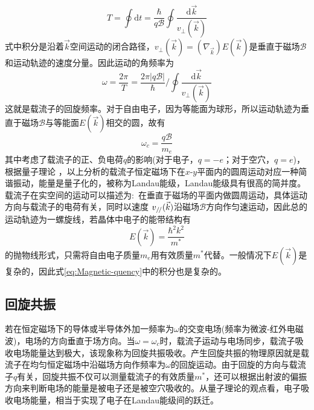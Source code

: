 \begin{equation}
	T=\oint\mathrm{d}t=\dfrac{\hbar}{q\mathscr{B}}\oint\dfrac{\mathrm{d}\vec k}{v_{\perp}(\vec k)}
	\label{eq:Magnet-Time}
\end{equation}
式中积分是沿着$\vec k$空间运动的闭合路径，$v_{\perp}(\vec k)=(\nabla_{\vec k})E(\vec k)$是垂直于磁场$\mathscr{B}$和运动轨迹的速度分量。因此运动的角频率为
\begin{equation}
	\omega=\dfrac{2\pi}{T}=\dfrac{2\pi|q\mathscr{B}|}{\hbar}/\oint\dfrac{\mathrm{d}\vec k}{v_{\perp}(\vec k)}
	\label{eq:Magnetic-quency}
\end{equation}
这就是载流子的回旋频率。对于自由电子，因为等能面为球形，所以运动轨迹为垂直于磁场$\mathscr{B}$与等能面$E(\vec k)$相交的圆，故有
\begin{equation}
	\omega_c=\dfrac{q\mathscr{B}}{m_e}
	\label{eq:Magnetic-circle-quency}
\end{equation}
其中考虑了载流子的正、负电荷$q$的影响(对于电子，$q=-e$；对于空穴，$q=e$)，根据量子理论%
，以上分析的载流子恒定磁场下在$x$-$y$平面内的圆周运动对应一种简谐振动，能量是量子化的，被称为Landau能级，Landau能级具有很高的简并度。载流子在实空间的运动可以描述为:~在垂直于磁场的平面内做圆周运动，具体运动方向与载流子的电荷有关，同时以速度%
$v_{\mathrel{/\mskip-2.5mu/}}(\vec k)$沿磁场$\mathscr{B}$方向作匀速运动，因此总的运动轨迹为一螺旋线，若晶体中电子的能带结构有
\begin{equation}
	E(\vec k)=\dfrac{\hbar^2k^2}{m^{\ast}}
	\label{eq:like-Free_electron-energy}
\end{equation}
的抛物线形式，只需将自由电子质量$m_e$用有效质量$m^{\ast}$代替。一般情况下$E(\vec k)$是复杂的，因此式\ref{eq:Magnetic-quency}中的积分也是复杂的。

\subsection{回旋共振} 
若在恒定磁场下的导体或半导体外加一频率为$\omega$的交变电场(频率为微波-红外电磁波)，电场的方向垂直于场方向。当$\omega=\omega_c$时，载流子运动与电场同步，载流子吸收电场能量达到极大，该现象称为回旋共振吸收。产生回旋共振的物理原因就是载流子在均匀恒定磁场中沿磁场方向作频率为$\omega$的回旋运动。由于回旋的方向与载流子$q$有关，回旋共振不仅可以测量载流子的有效质量$m^{\ast}$，还可以根据出射波的偏振方向来判断电场的能量是被电子还是被空穴吸收的。从量子理论的观点看，电子吸收电场能量，相当于实现了电子在Landau能级间的跃迁。

